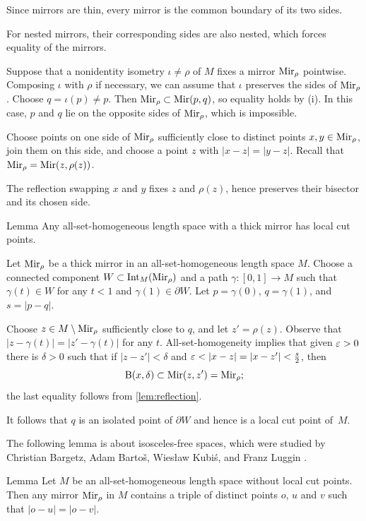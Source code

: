\documentclass[a4paper,10pt]{article}
\begin{document}
Since mirrors are thin, every mirror is the common boundary of its two sides.

For nested mirrors, their corresponding sides are also nested,
which forces equality of the mirrors.

Suppose that a nonidentity isometry $\iota\ne \rho$ of $M$ fixes a mirror $\mathrm{Mir}_\rho$ pointwise.
Composing $\iota$ with $\rho$ if necessary, we can assume that $\iota$ preserves the sides of $\mathrm{Mir}_\rho$.
Choose $q=\iota(p)\ne p$.
Then $\mathrm{Mir}_\rho\subset \mathrm{Mir}(p,q)$, so equality holds by (i).
In this case, $p$ and $q$ lie on the opposite sides of $\mathrm{Mir}_\rho$, which is impossible.

Choose points on one side of $\mathrm{Mir}_\rho$ sufficiently close to distinct points $x,y\in\mathrm{Mir}_\rho$, join them on this side, and choose a point $z$ with $|x-z|=|y-z|$.
Recall that $\mathrm{Mir}_\rho=\mathrm{Mir}(z,\rho(z))$.

The reflection swapping $x$ and $y$ fixes $z$ and $\rho(z)$, hence preserves their bisector and its chosen side.
\qeds

\begin{thm}{Lemma}\label{prop:thick mirror}
Any all-set-homogeneous length space with a thick mirror has local cut points.
\end{thm}

Let $\mathrm{Mir}_\rho$ be a thick mirror in an all-set-homogeneous length space $M$.
Choose a connected component $W\subset\mathrm{Int}_M(\mathrm{Mir}_\rho)$ and a path $\gamma\colon[0,1]\to M$
such that $\gamma(t)\in W$ for any $t<1$ and $\gamma(1)\in\partial W$.
Let $p=\gamma(0)$, $q=\gamma(1)$, and $s=|p-q|$.

Choose $z\in M\setminus \mathrm{Mir}_\rho$ sufficiently close to $q$,
and let $z'=\rho(z)$.
Observe that $|z-\gamma(t)|=|z'-\gamma(t)|$ for any $t$.
All-set-homogeneity implies that given $\varepsilon>0$ there is $\delta>0$ such that if $|z-z'|<\delta$ and $\eps<|x-z|=|x-z'|<\tfrac s2$, then
\[\mathrm{B}(x,\delta)\subset \mathrm{Mir}(z,z')=\mathrm{Mir}_\rho;\]
the last equality follows from \ref{lem:reflection}.

It follows that $q$ is an isolated point of $\partial W$ and hence is a local cut point of~$M$.
\qeds

The following lemma is about isosceles-free spaces, which were studied by Christian Bargetz, Adam Bartoš, Wiesław Kubiś, and Franz Luggin \cite{bargetz-bartos-kubis-luggin}.

\begin{thm}{Lemma}\label{lem:equilateral-set}
Let $M$ be an all-set-homogeneous length space without local cut points.
Then any mirror $\mathrm{Mir}_\rho$ in $M$ contains a triple of distinct points $o$, $u$ and $v$ such that $|o-u|=|o-v|$.
\end{thm}
\end{document}

